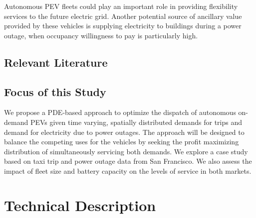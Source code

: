 \documentclass[journal]{IEEEtran}
\begin{document}
Autonomous PEV fleets could play an important role in providing flexibility services to the future electric grid. Another potential source of ancillary value provided by these vehicles is supplying electricity to buildings during a power outage, when occupancy willingness to pay is particularly high. 

\subsection{Relevant Literature}

\subsection{Focus of this Study}

We propose a PDE-based approach to optimize the dispatch of autonomous on-demand PEVs given time varying, spatially distributed demands for trips and demand for electricity due to power outages. The approach will be designed to balance the competing uses for the vehicles by seeking the profit maximizing distribution of simultaneously servicing both demands. We explore a case study based on taxi trip and power outage data from San Francisco. We also assess the impact of fleet size and battery capacity on the levels of service in both markets. 

\section{Technical Description}
\end{document}

